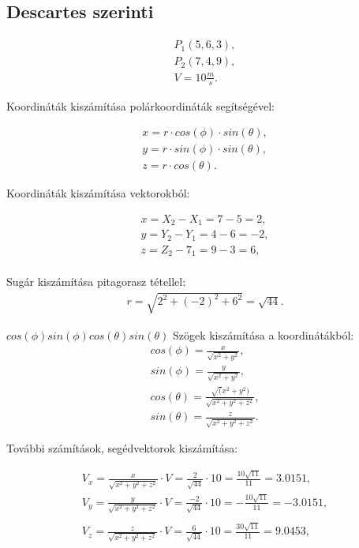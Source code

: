 \subsection{Descartes szerinti}
\begin{gather*}
    P_1(5,6,3), \\
    P_2(7,4,9), \\
    V = 10 \frac{m}{s} .
\end{gather*}


Koordináták kiszámítása polárkoordináták segítségével:

\begin{gather*}
    x = r \cdot cos(\phi) \cdot sin(\theta), \\
    y = r \cdot sin(\phi) \cdot sin(\theta), \\
    z = r \cdot cos(\theta).
\end{gather*}


Koordináták kiszámítása vektorokból:

\begin{gather*}
    x = X_2 - X_1 = 7 - 5 = 2, \\
    y = Y_2 - Y_1 = 4 - 6 = -2, \\
    z = Z_2 - 7_1 = 9 - 3 = 6, \\
\end{gather*}

Sugár kiszámítása pitagorasz tétellel:
\begin{gather*}
    r = \sqrt{2^2 + (-2)^2 + 6^2} = \sqrt{44}.
\end{gather*}

$
cos(\phi) sin(\phi) cos(\theta) sin(\theta)
$
Szögek kiszámítása a koordinátákból:
\begin{gather*}
    cos(\phi) = \frac{x}{\sqrt{x^2 + y^2}}, \\
    sin(\phi) = \frac{y}{\sqrt{x^2 + y^2}}, \\
    cos(\theta) = \frac{\sqrt(x^2 + y^2)}{\sqrt{x^2 + y^2 + z^2}}, \\
    sin(\theta) = \frac{z}{\sqrt{x^2 + y^2 + z^2}}.
\end{gather*}


További számítások, segédvektorok kiszámítása:

\begin{gather*}
    V_x = \frac{x}{\sqrt{x^2 + y^2 + z^2}} \cdot V = \frac{2}{\sqrt{44}} \cdot 10 = \frac{10\sqrt{11}}{11} = 3.0151,\\
    V_y = \frac{y}{\sqrt{x^2 + y^2 + z^2}} \cdot V = \frac{-2}{\sqrt{44}} \cdot 10 = -\frac{10\sqrt{11}}{11} = -3.0151,\\\\
    V_z = \frac{z}{\sqrt{x^2 + y^2 + z^2}} \cdot V = \frac{6}{\sqrt{44}} \cdot 10 = \frac{30\sqrt{11}}{11} = 9.0453,\\
\end{gather*}


